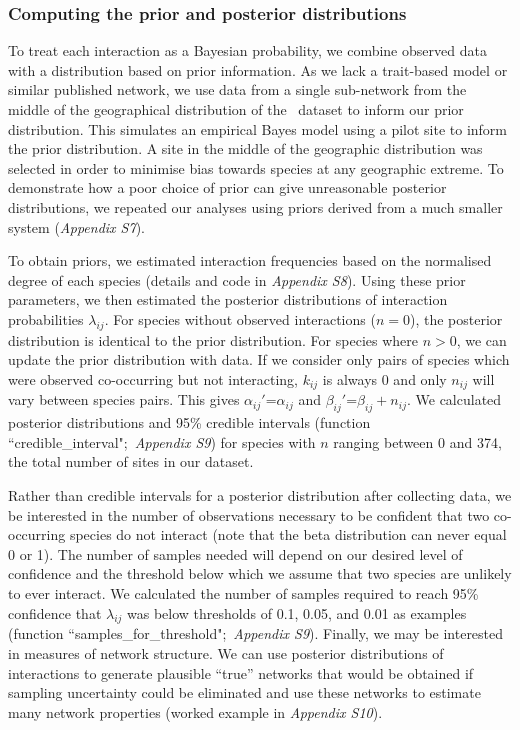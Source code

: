 \documentclass[12pt]{article}
\begin{document}
\begin{spacing}{1.5}
    \subsubsection*{Computing the prior and posterior distributions}

        To treat each interaction as a Bayesian probability, we combine observed data with a distribution based on prior information. As we lack a trait-based model or similar published network, we use data from a single sub-network from the middle of the geographical distribution of the~\citet{Kopelke2017} dataset to inform our prior distribution. This simulates an empirical Bayes model using a pilot site to inform the prior distribution. A site in the middle of the geographic distribution was selected in order to minimise bias towards species at any geographic extreme. To demonstrate how a poor choice of prior can give unreasonable posterior distributions, we repeated our analyses using priors derived from a much smaller system (\emph{Appendix S7}). 


        To obtain priors, we estimated interaction frequencies based on the normalised degree of each species (details and code in \emph{Appendix S8}). Using these prior parameters, we then estimated the posterior distributions of interaction probabilities $\lambda_{ij}$. For species without observed interactions ($n=0$), the posterior distribution is identical to the prior distribution. For species where $n>0$, we can update the prior distribution with data. If we consider only pairs of species which were observed co-occurring but not interacting, $k_{ij}$ is always 0 and only $n_{ij}$ will vary between species pairs. This gives $\alpha_{ij}'$=$\alpha_{ij}$ and $\beta_{ij}'$=$\beta_{ij}+n_{ij}$. We calculated posterior distributions and 95\% credible intervals (function ``credible\_interval";~\emph{Appendix S9}) for species with $n$ ranging between 0 and 374, the total number of sites in our dataset. 


        Rather than credible intervals for a posterior distribution after collecting data, we be interested in the number of observations necessary to be confident that two co-occurring species do not interact (note that the beta distribution can never equal 0 or 1). The number of samples needed will depend on our desired level of confidence and the threshold below which we assume that two species are unlikely to ever interact. We calculated the number of samples required to reach 95\% confidence that $\lambda_{ij}$ was below thresholds of 0.1, 0.05, and 0.01 as examples (function ``samples\_for\_threshold";~\emph{Appendix S9}). Finally, we may be interested in measures of network structure. We can use posterior distributions of interactions to generate plausible ``true'' networks that would be obtained if sampling uncertainty could be eliminated and use these networks to estimate many network properties (worked example in \emph{Appendix S10}).



\end{spacing}
\end{document}
